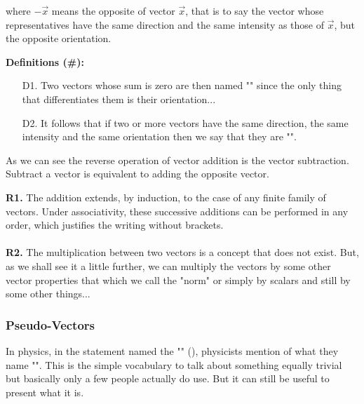 where $-\vec{x}$ means the opposite of vector $\vec{x}$, that is to say the vector whose representatives have the same direction and the same intensity as those of $\vec{x}$, but the opposite orientation. 

\textbf{Definitions (\#\mydef):}
	\begin{enumerate}
		\item[D1.] Two vectors whose sum is zero are then named "" since the only thing that differentiates them is their orientation...
		\item[D2.] It follows that if two or more vectors have the same direction, the same intensity and the same orientation then  we say that they are "".
	\end{enumerate}
As we can see the reverse operation of vector addition is the vector subtraction. Subtract a vector is equivalent to adding the opposite vector.

	\begin{tcolorbox}[title=Remarks,colframe=black,arc=10pt]
\textbf{R1.} The addition extends, by induction, to the case of any finite family of vectors. Under associativity, these successive additions can be performed in any order, which justifies the writing without brackets.\\\\
\textbf{R2.} The multiplication between two vectors is a concept that does not exist. But, as we shall see it a little further, we can multiply the vectors by some other vector properties that which we call the "norm" or simply by scalars and still by some other things...
	\end{tcolorbox}	

\subsubsection{Pseudo-Vectors}

In physics, in the statement named the "" (), physicists mention of what they name ""\label{pseudo vector}. This is the simple vocabulary to talk about something equally trivial but basically only a few people actually do use. But it can still be useful to present what it is.

